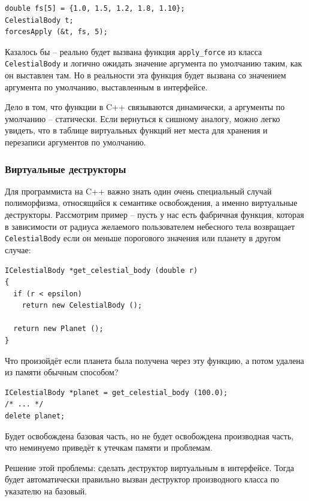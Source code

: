 \documentclass[a4paper,12pt,oneside]{article}
\begin{document}
\begin{lstlisting}
double fs[5] = {1.0, 1.5, 1.2, 1.8, 1.10};
CelestialBody t;
forcesApply (&t, fs, 5);
\end{lstlisting}

Казалось бы -- реально будет вызвана функция \lstinline!apply_force! из класса \lstinline!CelestialBody! и логично ожидать значение аргумента по умолчанию таким, как он выставлен там. Но в реальности эта функция будет вызвана со значением аргумента по умолчанию, выставленным в интерфейсе.

Дело в том, что функции в C++ связываются динамически, а аргументы по умолчанию – статически. Если вернуться к сишному аналогу, можно легко увидеть, что в таблице виртуальных функций нет места для хранения и перезаписи аргументов по умолчанию.

\subsubsection{Виртуальные деструкторы}\label{VirtDestr}

Для программиста на C++ важно знать один очень специальный случай полиморфизма, относящийся к семантике освобождения, а именно виртуальные деструкторы. Рассмотрим пример – пусть у нас есть фабричная функция, которая в зависимости от радиуса желаемого пользователем небесного тела возвращает \lstinline!CelestialBody! если он меньше порогового значения или планету в другом случае:

\begin{lstlisting}
ICelestialBody *get_celestial_body (double r)
{
  if (r < epsilon)
    return new CelestialBody ();

  return new Planet ();
}
\end{lstlisting}

Что произойдёт если планета была получена через эту функцию, а потом удалена из памяти обычным способом?

\begin{lstlisting}
ICelestialBody *planet = get_celestial_body (100.0);
/* ... */
delete planet;
\end{lstlisting}

Будет освобождена базовая часть, но не будет освобождена производная часть, что неминуемо приведёт к утечкам памяти и проблемам. 

Решение этой проблемы: сделать деструктор виртуальным в интерфейсе. Тогда будет автоматически правильно вызван деструктор производного класса по указателю на базовый.
\end{document}
